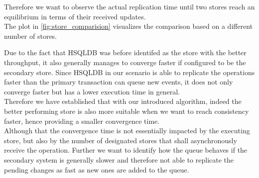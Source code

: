 Therefore we want to observe the actual replication time until two stores reach an equilibrium in terms of their received updates.\\
The plot in \ref{fig:store_comparision} visualizes the comparison based on a different number of stores.

Due to the fact that HSQLDB was before identifed as the store with the better throughput, 
it also generally manages to converge faster if configured to be the secondary store. 
Since HSQLDB in our scenario is able to replicate the operations faster than the primary transaction can queue new events,
it does not only converge faster but has a lower execution time in general.\\
Therefore we have established that with our introduced algorithm, indeed
the better performing store is also more suitable when we want to reach consistency faster, hence providing a smaller convergence time.\\




Although that the convergence time is not essentially impacted by the executing store, but also by the number of designated stores that shall asynchronously 
receive the operation. 
Further we want to identify how the queue behaves if the secondary system is generally slower and therefore not able to replicate 
the pending changes as fast as new ones are added to the queue.



